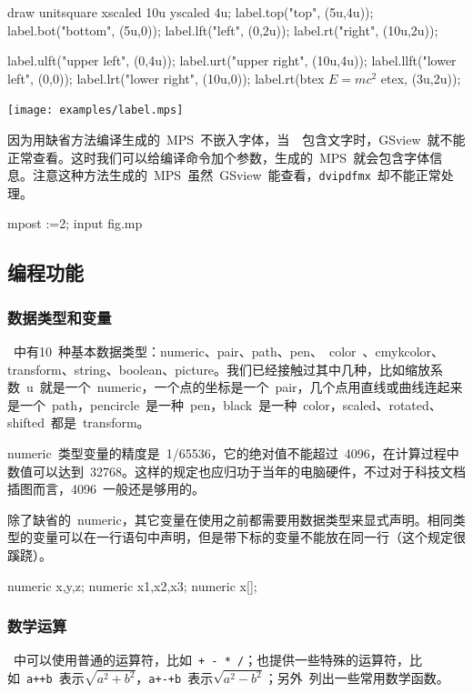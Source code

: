 \begin{code}
draw unitsquare xscaled 10u yscaled 4u;
label.top("top", (5u,4u));
label.bot("bottom", (5u,0));
label.lft("left", (0,2u));
label.rt("right", (10u,2u));
\end{code}
\begin{code}
label.ulft("upper left", (0,4u));
label.urt("upper right", (10u,4u));
label.llft("lower left", (0,0));
label.lrt("lower right", (10u,0));
label.rt(btex $E=mc^2$ etex, (3u,2u));
\end{code}

\begin{out}
\texttt{[image: examples/label.mps]}
\end{out}

因为用缺省方法编译生成的~MPS~不嵌入字体，当~\MP~包含文字时，GSview~就不能正常查看。这时我们可以给编译命令加个参数，生成的~MPS~就会包含字体信息。注意这种方法生成的~MPS~虽然~GSview~能查看，\verb|dvipdfmx|~却不能正常处理。

\begin{code}
mpost \prologues:=2; input fig.mp
\end{code}

\subsection{编程功能}

\subsubsection{数据类型和变量}
\MP~中有10~种基本数据类型：numeric、pair、path、pen、~color~、cmykcolor、transform、string、boolean、picture。我们已经接触过其中几种，比如缩放系数~u~就是一个~numeric，一个点的坐标是一个~pair，几个点用直线或曲线连起来是一个~path，pencircle~是一种~pen，black~是一种~color，scaled、rotated、shifted~都是~transform。

numeric~类型变量的精度是~1/65536，它的绝对值不能超过~4096，在计算过程中数值可以达到~32768。这样的规定也应归功于当年的电脑硬件，不过对于科技文档插图而言，4096~一般还是够用的。

除了缺省的~numeric，其它变量在使用之前都需要用数据类型来显式声明。相同类型的变量可以在一行语句中声明，但是带下标的变量不能放在同一行（这个规定很蹊跷）。
\begin{code}
numeric x,y,z;    %
numeric x1,x2,x3; %
numeric x[];      %
\end{code}

\subsubsection{数学运算}
\MP~中可以使用普通的运算符，比如~\verb|+ - * /|；也提供一些特殊的运算符，比如~\verb|a++b|~表示$\sqrt{a^2+b^2}$，\verb|a+-+b|~表示$\sqrt{a^2-b^2}$；另外~列出一些常用数学函数。

